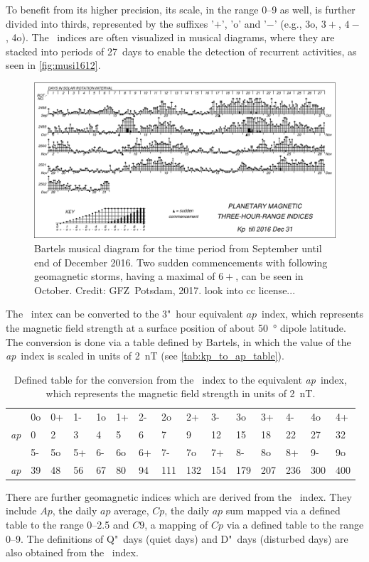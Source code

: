 To benefit from its higher precision, its scale, in the range 0--9 as well, is further divided into thirds, represented by the suffixes '$+$', 'o' and '$-$' (e.g., 3o, $3+$, $4-$, 4o). The \Kp{}~indices are often visualized in musical diagrams, where they are stacked into periods of 27~days to enable the detection of recurrent activities, as seen in \autoref{fig:musi1612}.
\begin{figure}[htb]
	\centering
	\includegraphics[width=\textwidth]{images/musi1612.pdf}
	\caption{Bartels musical \Kp{} diagram for the time period from September until end of December 2016. Two sudden commencements with following geomagnetic storms, having a maximal \Kp{} of $6+$, can be seen in October. Credit: GFZ~Potsdam, 2017. look into cc license...}
	\label{fig:musi1612}
\end{figure}

The \Kp{}~intex can be converted to the 3"~hour equivalent $ap$~index, which represents the magnetic field strength at a surface position of about \SI{50}{\degree} dipole latitude. The conversion is done via a table defined by Bartels, in which the value of the \textit{ap}~index is scaled in units of \SI{2}{nT} (see \autoref{tab:kp_to_ap_table}).
\begin{table}
	\caption{Defined table for the conversion from the \Kp~index to the equivalent \textit{ap}~index, which represents the magnetic field strength in units of \SI{2}{nT}.}
	\label{tab:kp_to_ap_table}
	\centering
	\begin{tabular}{lssssssssssssss}
		\Kp	&0o	&0+	&1-	&1o	&1+	&2-	&2o	&2+	&3-	&3o	&3+	&4-	&4o	&4+\\
		\textit{ap}	&0	&2	&3	&4	&5	&6	&7	&9	&12	&15	&18	&22	&27	&32\\
		\hline
		\Kp	&5-	&5o	&5+	&6-	&6o	&6+	&7-	&7o	&7+	&8-	&8o	&8+	&9-	&9o\\
		\textit{ap}	&39	&48	&56	&67	&80	&94	&111	&132	&154	&179	&207	&236	&300	&400
	\end{tabular}
\end{table}
There are further geomagnetic indices which are derived from the \Kp{}~index. They include $Ap$, the daily $ap$ average, $Cp$, the daily $ap$ sum mapped via a defined table to the range \numrange{0}{2.5} and $C9$, a mapping of $Cp$ via a defined table to the range \numrange{0}{9}. The definitions of Q"~days (quiet days) and D"~days (disturbed days) are also obtained from the \Kp{}~index.

